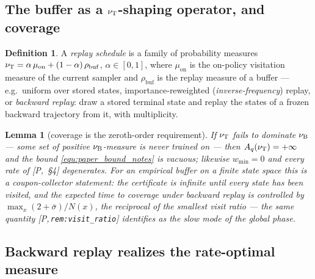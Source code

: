 \documentclass[11pt]{article}
\newtheorem{lemma}[theorem]{Lemma}
\theoremstyle{definition}
\newtheorem{definition}[theorem]{Definition}
\theoremstyle{remark}
\newcommand{\paperref}[1]{[P,\,\texttt{#1}]}   %
\begin{document}
\subsection{The buffer as a $\nu_{\mathrm{T}}$-shaping operator, and coverage}\label{sec:buffer_def_notes}

\begin{definition}\label{def:buffer_notes}
A \emph{replay schedule} is a family of probability measures
$\nu_{\mathrm{T}} = \alpha\,\mu_{\mathrm{on}} + (1-\alpha)\,\rho_{\mathrm{buf}}$, $\alpha\in[0,1]$,
where $\mu_{\mathrm{on}}$ is the on-policy visitation measure of the current sampler and
$\rho_{\mathrm{buf}}$ is the replay measure of a buffer --- e.g.\ uniform over stored
states, importance-reweighted (\emph{inverse-frequency}) replay, or
\emph{backward replay}: draw a stored terminal state and replay the states of a frozen
backward trajectory from it, with multiplicity.
\end{definition}

\begin{lemma}[coverage is the zeroth-order requirement]\label{lem:coverage_notes}
If $\nu_{\mathrm{T}}$ fails to dominate $\nu_{\mathrm{B}}$ --- some set of positive $\nu_{\mathrm{B}}$-measure is
never trained on --- then $A_q(\nu_{\mathrm{T}})=+\infty$ and the bound \eqref{equ:paper_bound_notes}
is vacuous; likewise $w_{\min}=0$ and every rate of [P,~\S4] degenerates. For an empirical
buffer on a finite state space this is a coupon-collector statement: the certificate is
infinite until every state has been visited, and the expected time to coverage under
backward replay is controlled by $\max_x(2+\bar\sigma)/N(x)$, the reciprocal of the
smallest visit ratio --- the same quantity \paperref{rem:visit\_ratio} identifies as the
slow mode of the global phase.
\end{lemma}

\subsection{Backward replay realizes the rate-optimal measure}\label{sec:backward_replay_notes}
\end{document}
